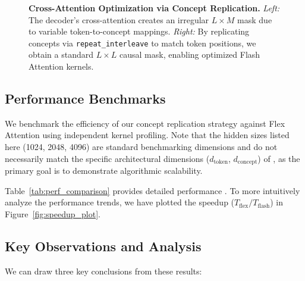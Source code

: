 \begin{figure}[t]
{
}
\caption{\textbf{Cross-Attention Optimization via Concept Replication.} 
\textit{Left:} The decoder's cross-attention creates an irregular $L \times M$ mask due to variable token-to-concept mappings. 
\textit{Right:} By replicating concepts via \texttt{repeat\_interleave} to match token positions, we obtain a standard $L \times L$ causal mask, enabling optimized Flash Attention kernels.}
\label{fig:cross_attn_optimization}
\end{figure}

\subsection{Performance Benchmarks}

We benchmark the efficiency of our concept replication strategy against Flex Attention using independent kernel profiling. Note that the hidden sizes listed here (1024, 2048, 4096) are standard benchmarking dimensions and do not necessarily match the specific architectural dimensions ($d_{\text{token}}$, $d_{\text{concept}}$) of \ModelName{}, as the primary goal is to demonstrate algorithmic scalability.

Table~\ref{tab:perf_comparison} provides detailed performance . To more intuitively analyze the performance trends, we have plotted the speedup ($T_{\text{flex}} / T_{\text{flash}}$) in Figure~\ref{fig:speedup_plot}.





\subsection{Key Observations and Analysis}

We can draw three key conclusions from these results:

